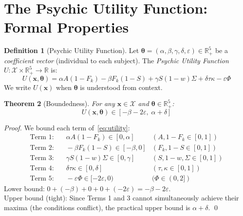 \documentclass[12pt,a4paper]{article}
\theoremstyle{plain}
\newtheorem{theorem}{Theorem}[section]
\theoremstyle{definition}
\newtheorem{definition}[theorem]{Definition}
\theoremstyle{remark}
\newcommand{\R}{\mathbb{R}}
\newcommand{\X}{\mathcal{X}}
\newcommand{\Fk}{F_k}
\newcommand{\btheta}{\boldsymbol{\theta}}
\begin{document}
\section{The Psychic Utility Function: Formal Properties}

\begin{definition}[Psychic Utility Function]\label{def:utility}
Let $\btheta = (\alpha, \beta, \gamma, \delta, \varepsilon) \in \R_+^5$ be a \emph{coefficient vector} (individual to each subject). The \emph{Psychic Utility Function} $U: \X \times \R_+^5 \to \R$ is:
\begin{equation}\label{eq:utility}
U(\mathbf{x}, \btheta) = \alpha A(1-\Fk) - \beta \Fk(1-S) + \gamma S(1-w)\Sigma + \delta\tau\kappa - \varepsilon\Phi
\end{equation}
We write $U(\mathbf{x})$ when $\btheta$ is understood from context.
\end{definition}

\begin{theorem}[Boundedness]\label{thm:bounded}
For any $\mathbf{x} \in \X$ and $\btheta \in \R_+^5$:
\[
U(\mathbf{x}, \btheta) \in [-\beta - 2\varepsilon,\; \alpha + \delta]
\]
\end{theorem}

\begin{proof}
We bound each term of~\eqref{eq:utility}:
\begin{align*}
\text{Term 1:} &\quad \alpha A(1-\Fk) \in [0, \alpha] & (A, 1-\Fk \in [0,1]) \\
\text{Term 2:} &\quad -\beta \Fk(1-S) \in [-\beta, 0] & (\Fk, 1-S \in [0,1]) \\
\text{Term 3:} &\quad \gamma S(1-w)\Sigma \in [0, \gamma] & (S, 1-w, \Sigma \in [0,1]) \\
\text{Term 4:} &\quad \delta\tau\kappa \in [0, \delta] & (\tau, \kappa \in [0,1]) \\
\text{Term 5:} &\quad -\varepsilon\Phi \in [-2\varepsilon, 0) & (\Phi \in (0,2])
\end{align*}
Lower bound: $0 + (-\beta) + 0 + 0 + (-2\varepsilon) = -\beta - 2\varepsilon$.\\
Upper bound (tight): Since Terms 1 and 3 cannot simultaneously achieve their maxima (the conditions conflict), the practical upper bound is $\alpha + \delta$. \qed
\end{proof}
\end{document}
